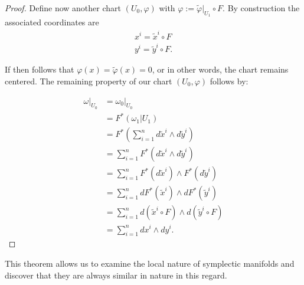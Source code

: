 \begin{proof}
Define now another chart $(U_0,\varphi)$ with $\varphi := \tilde{\varphi}|_{U_1} \circ  F$. By construction the associated coordinates are
\begin{align*}
x^i = \tilde{x}^i \circ F \\
y^i = \tilde{y}^i \circ F.
\end{align*}

If then follows that $\varphi(x) = \tilde{\varphi}(x) = 0$, or in other words, the chart remains centered. The remaining property of our chart $(U_0,\varphi)$ follows by:

\begin{align*}
\omega|_{U_0} &= \omega_0|_{U_0} \\
&= F^* (\omega_1|{U_1}) \\
&= F^* \left( \sum^n_{i=1} d\tilde{x}^i \wedge d\tilde{y}^i \right) \\
&= \sum^n_{i=1} F^* (d\tilde{x}^i \wedge d\tilde{y}^i) \\
&= \sum^n_{i=1} F^*(d\tilde{x}^i) \wedge F^*(d\tilde{y}^i) \\
&= \sum^n_{i=1} d F^*(\tilde{x}^i) \wedge d F^*(\tilde{y}^i) \\
&= \sum^n_{i=1} d (\tilde{x}^i \circ F) \wedge d ( \tilde{y}^i \circ F) \\
&= \sum^n_{i=1} dx^i \wedge dy^i.
\end{align*}






\end{proof}

\begin{remark}
This theorem allows us to examine the local nature of symplectic manifolds and discover that they are always similar in nature in this regard.
\end{remark}



\clearpage

